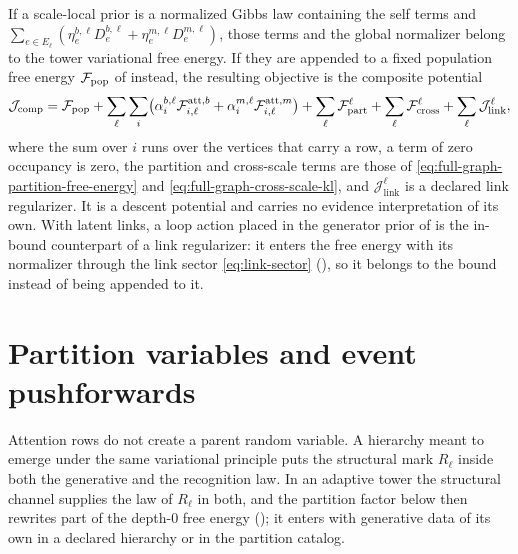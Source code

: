 If a scale-local prior is a normalized Gibbs law containing the self terms and
$\sum_{e\in E_\ell}(\eta^{b,\ell}_eD^{b,\ell}_e+\eta^{m,\ell}_eD^{m,\ell}_e)$, those
terms and the global normalizer belong to the tower variational free energy. If they
are appended to a fixed population free energy $\mathcal F_{\mathrm{pop}}$ of
 instead, the resulting objective is the composite
potential
\begin{equation}
\mathcal J_{\mathrm{comp}}
=\mathcal F_{\mathrm{pop}}
+\sum_\ell\sum_i\bigl(\alpha^{b,\ell}_i\mathcal F^{\mathrm{att},b}_{i,\ell}
+\alpha^{m,\ell}_i\mathcal F^{\mathrm{att},m}_{i,\ell}\bigr)
+\sum_\ell\mathcal F^\ell_{\mathrm{part}}
+\sum_\ell\mathcal F^\ell_{\mathrm{cross}}
+\sum_\ell\mathcal J^\ell_{\mathrm{link}},
\label{eq:full-graph-composite-potential}
\end{equation}
where the sum over $i$ runs over the vertices that carry a row, a term of zero occupancy is
zero, the partition and cross-scale terms are those of \eqref{eq:full-graph-partition-free-energy}
and \eqref{eq:full-graph-cross-scale-kl}, and $\mathcal J^\ell_{\mathrm{link}}$ is a declared link
regularizer. It is a descent potential and carries no evidence
interpretation of its own. With latent links, a loop action placed in the generator prior of
 is the in-bound counterpart of a link regularizer: it enters the free
energy with its normalizer through the link sector \eqref{eq:link-sector}
(), so it belongs to the bound instead of being appended to it.

\section{Partition variables and event pushforwards}
\label{sec:full-graph-vfe-partitions}

Attention rows do not create a parent random variable. A hierarchy meant to emerge
under the same variational principle puts the structural mark $R_\ell$ inside both
the generative and the recognition law. In an adaptive tower the structural channel supplies
the law of $R_\ell$ in both, and the partition factor below then rewrites part of the depth-$0$
free energy (); it enters with generative data of its own
in a declared hierarchy or in the partition catalog.

